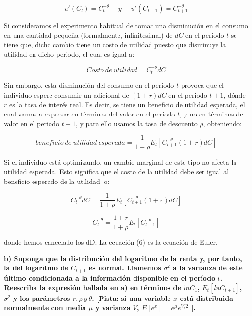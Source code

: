 \documentclass[
]{article}
\begin{document}
\begin{equation} 
u'(C_t) = C_t^{-\theta} \ \ \ \ \ \ y \ \ \ \ \ \ u'(C_{t+1}) = C_{t+1}^{-\theta}
\end{equation}

Si consideramos el experimento habitual de tomar una disminución en el
consumo en una cantidad pequeña (formalmente, infinitesimal) de \(dC\)
en el período \(t\) se tiene que, dicho cambio tiene un costo de
utilidad puesto que disminuye la utilidad en dicho periodo, el cual es
igual a:

\begin{equation}
Costo \ de \ utilidad=C_t^{-\theta}dC
\end{equation}

Sin embargo, esta disminución del consumo en el periodo \(t\) provoca
que el individuo espere consumir un adicional de \((1+r)dC\) en el
periodo \(t+1\), dónde \(r\) es la tasa de interés real. Es decir, se
tiene un beneficio de utilidad esperada, el cual vamos a expresar en
términos del valor en el periodo \(t\), y no en términos del valor en el
periodo \(t+1\), y para ello usamos la tasa de descuento \(\rho\),
obteniendo:

\begin{equation}
beneficio \ de\  utilidad \ esperada = \frac{1}{1+\rho}E_t[C_{t+1}^{-\theta}(1+r)dC]
\end{equation}

Si el individuo está optimizando, un cambio marginal de este tipo no
afecta la utilidad esperada. Esto significa que el costo de la utilidad
debe ser igual al beneficio esperado de la utilidad, o:

\begin{equation}
C_t^{-\theta}dC = \frac{1}{1+\rho}E_t[C_{t+1}^{-\theta}(1+r)dC]
\end{equation}

\begin{equation}
C_{t}^{-\theta}=\frac{1+r}{1+\rho}E_t[C_{t+1}^{-\theta}]
\end{equation}

donde hemos cancelado los dD. La ecuación (6) es la ecuación de Euler.

\textbf{b) Suponga que la distribución del logaritmo de la renta y, por
tanto, la del logaritmo de \(C_{t+1}\) es normal. Llamemos \(\sigma^2\)
a la varianza de este último condicionada a la información disponible en
el período \(t\). Reescriba la expresión hallada en a) en términos de
\(lnC_1\), \(E_t [lnC_{t+1} ]\), \(\sigma^2\) y los parámetros
\(r,\rho \ y \ \theta\). {[}Pista: si una variable \(x\) está
distribuida normalmente con media \(\mu\) y varianza \(V\),
\(E[e^x]=e^{\mu} e^{V/2}\) {]}.}
\end{document}
